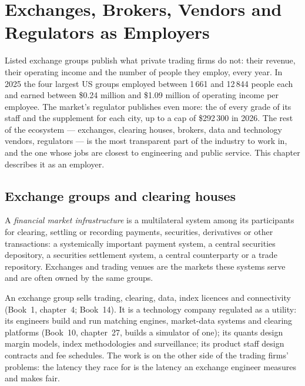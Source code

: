 \chapter{Exchanges, Brokers, Vendors and Regulators as Employers}\label{ch:in:exchanges-brokers-vendors-and-regulators-as-employers}

Listed exchange groups publish what private trading firms do not: their revenue, their operating income and the number
of people they employ, every year. In 2025 the four largest US groups employed between 1\,661 and 12\,844 people each and
earned between \$0.24 million and \$1.09 million of operating income per employee. The market's regulator publishes
even more: the  of every grade of its staff and the supplement for each city, up to a cap of \$292\,300 in 2026.
The rest of the ecosystem --- exchanges, clearing houses, brokers, data and technology vendors, regulators --- is the most
transparent part of the industry to work in, and the one whose jobs are closest to engineering and public service. This
chapter describes it as an employer.

\section{Exchange groups and clearing houses}

\begin{definition}\label{def:in:exchanges-brokers-vendors-and-regulators-as-employers:fmi}
A \emph{financial market infrastructure} is a multilateral system among its
participants for clearing, settling or recording payments, securities, derivatives or other transactions: a
systemically important payment system, a central securities depository, a securities settlement system, a central
counterparty or a trade repository. Exchanges and trading venues are the markets these systems serve and are often owned
by the same groups.
\end{definition}

An exchange group sells trading, clearing, data, index licences and connectivity (Book~1, chapter~4; Book~14). It is a
technology company regulated as a utility: its engineers build and run matching engines, market-data systems and
clearing platforms (Book~10, chapter~27, builds a simulator of one); its quants design margin models, index methodologies
and surveillance; its product staff design contracts and fee schedules. The work is on the other side of the trading
firms' problems: the latency they race for is the latency an exchange engineer measures and makes fair.

